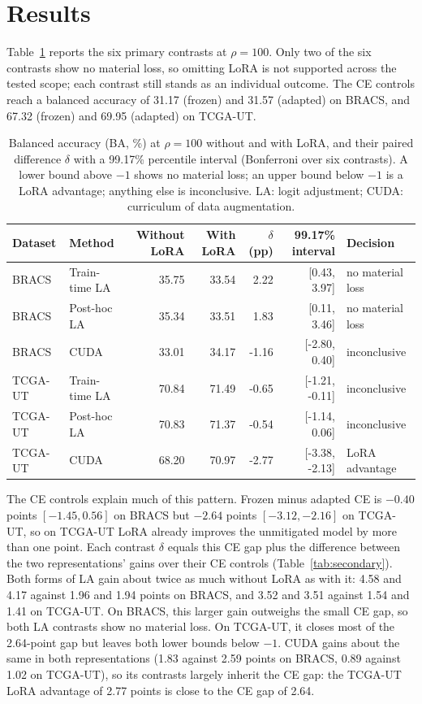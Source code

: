 \section{Results}
\label{sec:results}
Table~\ref{tab:contrast} reports the six primary contrasts at $\rho=100$. Only two of the six contrasts show no material loss, so omitting LoRA is not supported across the tested scope; each contrast still stands as an individual outcome.
The CE controls reach a balanced accuracy of 31.17 (frozen) and 31.57 (adapted) on BRACS, and 67.32 (frozen) and 69.95 (adapted) on TCGA-UT.

\begin{table}[htbp]
\centering
\small
\renewcommand{\arraystretch}{1.15}
\setlength{\tabcolsep}{4pt}
\begin{tabular}{@{}llrrrrl@{}}
\toprule
Dataset & Method & Without LoRA & With LoRA & $\delta$ (pp) & 99.17\% interval & Decision \\
\midrule
BRACS & Train-time LA & 35.75 & 33.54 & 2.22 & [0.43, 3.97] & no material loss \\
BRACS & Post-hoc LA & 35.34 & 33.51 & 1.83 & [0.11, 3.46] & no material loss \\
BRACS & CUDA & 33.01 & 34.17 & -1.16 & [-2.80, 0.40] & inconclusive \\
TCGA-UT & Train-time LA & 70.84 & 71.49 & -0.65 & [-1.21, -0.11] & inconclusive \\
TCGA-UT & Post-hoc LA & 70.83 & 71.37 & -0.54 & [-1.14, 0.06] & inconclusive \\
TCGA-UT & CUDA & 68.20 & 70.97 & -2.77 & [-3.38, -2.13] & LoRA advantage \\
\bottomrule
\end{tabular}
\caption{Balanced accuracy (BA, \%) at $\rho=100$ without and with LoRA, and their paired difference $\delta$ with a 99.17\% percentile interval (Bonferroni over six contrasts). A lower bound above $-1$ shows no material loss; an upper bound below $-1$ is a LoRA advantage; anything else is inconclusive. LA: logit adjustment; CUDA: curriculum of data augmentation.}
\label{tab:contrast}
\end{table}

The CE controls explain much of this pattern. Frozen minus adapted CE is $-0.40$ points $[-1.45, 0.56]$ on BRACS but $-2.64$ points $[-3.12, -2.16]$ on TCGA-UT, so on TCGA-UT LoRA already improves the unmitigated model by more than one point. Each contrast $\delta$ equals this CE gap plus the difference between the two representations' gains over their CE controls (Table~\ref{tab:secondary}). Both forms of LA gain about twice as much without LoRA as with it: 4.58 and 4.17 against 1.96 and 1.94 points on BRACS, and 3.52 and 3.51 against 1.54 and 1.41 on TCGA-UT. On BRACS, this larger gain outweighs the small CE gap, so both LA contrasts show no material loss. On TCGA-UT, it closes most of the 2.64-point gap but leaves both lower bounds below $-1$. CUDA gains about the same in both representations (1.83 against 2.59 points on BRACS, 0.89 against 1.02 on TCGA-UT), so its contrasts largely inherit the CE gap: the TCGA-UT LoRA advantage of 2.77 points is close to the CE gap of 2.64.

